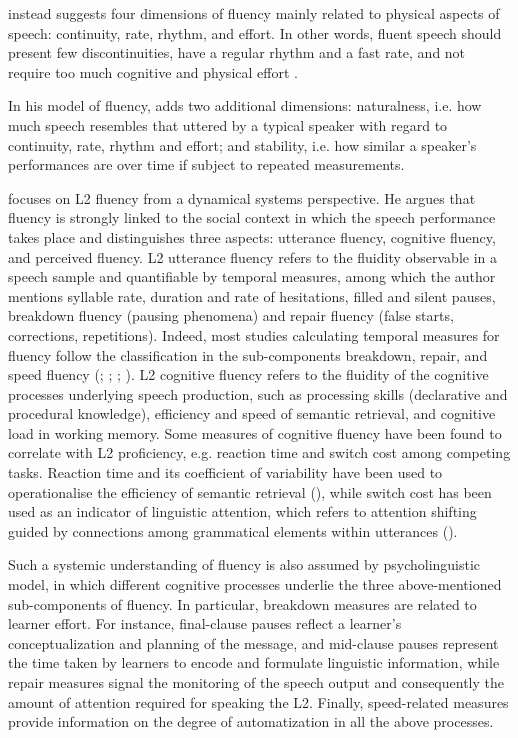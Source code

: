 \citet{Starkweather1987} instead suggests four dimensions of fluency mainly related to physical aspects of speech: continuity, rate, rhythm, and effort. In other words, fluent speech should present few discontinuities, have a regular rhythm and a fast rate, and not require too much cognitive and physical effort \citep{Zmarich2017}.

In his model of fluency, \citet{Logan2015} adds two additional dimensions: naturalness, i.e. how much speech resembles that uttered by a typical speaker with regard to continuity, rate, rhythm and effort; and stability, i.e. how similar a speaker’s performances are over time if subject to repeated measurements.

\citet{Segalowitz2010} focuses on L2 fluency from a dynamical systems perspective. He argues that fluency is strongly linked to the social context in which the speech performance takes place and distinguishes three aspects: utterance fluency, cognitive fluency, and perceived fluency. L2 utterance fluency refers to the fluidity observable in a speech sample and quantifiable by temporal measures, among which the author mentions syllable rate, duration and rate of hesitations, filled and silent pauses, breakdown fluency (pausing phenomena) and repair fluency (false starts, corrections, repetitions). Indeed, most studies calculating temporal measures for fluency follow the classification in the sub-components breakdown, repair, and speed fluency (\citealt{TavakoliSkehan2005}; \citealt{HuenschTracy-Ventura2017}; \citealt{TavakoliNakatsuharaHunter2020}; \citealt{LahmannSteinkraussSchmid2017}). L2 cognitive fluency refers to the fluidity of the cognitive processes underlying speech production, such as processing skills (declarative and procedural knowledge), efficiency and speed of semantic retrieval, and cognitive load in working memory. Some measures of cognitive fluency have been found to correlate with L2 proficiency, e.g. reaction time and switch cost among competing tasks. Reaction time and its coefficient of variability have been used to operationalise the efficiency of semantic retrieval (\citealt{SegalowitzFreed2004}), while switch cost has been used as an indicator of linguistic attention, which refers to attention shifting guided by connections among grammatical elements within utterances (\citealt{DuncanSegalowitzPhillips2014}).

Such a systemic understanding of fluency is also assumed by  psycholinguistic model, in which different cognitive processes underlie the three above-mentioned sub-components of fluency. In particular, breakdown measures are related to learner effort. For instance, final-clause pauses reflect a learner’s conceptualization and planning of the message, and mid-clause pauses represent the time taken by learners to encode and formulate linguistic information, while repair measures signal the monitoring of the speech output and consequently the amount of attention required for speaking the L2. Finally, speed-related measures provide information on the degree of automatization in all the above processes.

